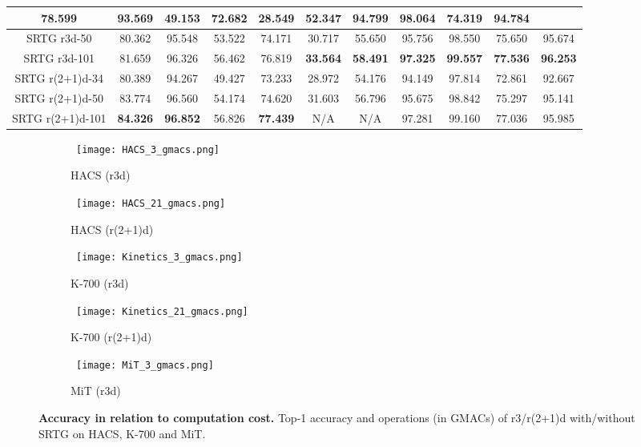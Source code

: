 \documentclass[final,5p,times,twocolumn]{elsarticle}
\begin{document}
\begin{table*}[ht]
{\begin{tabular}{ccccccccccc}
78.599 & 93.569 &
49.153 & 72.682 & 
28.549 & 52.347 &
94.799 & 98.064 &
74.319 & 94.784\\
\hline
SRTG r3d-50 &
80.362 & 95.548 &
53.522 & 74.171 & 
30.717 & 55.650 &
95.756 & 98.550 &
75.650 & 95.674\\
\hline
SRTG r3d-101 &
81.659 & 96.326 &
56.462 & 76.819 & 
\textbf{33.564} & \textbf{58.491} &
\textbf{97.325} & \textbf{99.557} &
\textbf{77.536} & \textbf{96.253}\\
\hline
SRTG r(2+1)d-34 &
80.389 & 94.267 &
49.427 & 73.233 & 
28.972 & 54.176 &
94.149 & 97.814 &
72.861 & 92.667\\
\hline
SRTG r(2+1)d-50 &
83.774 & 96.560 &
54.174 & 74.620 & 
31.603 & 56.796 &
95.675 & 98.842 &
75.297 & 95.141\\
\hline
SRTG r(2+1)d-101 &
\textbf{84.326} & \textbf{96.852} &
56.826 & \textbf{77.439} & 
N/A & N/A &
97.281 & 99.160 &
77.036 & 95.985\\
\hline
\hline
\end{tabular}}
\label{table:accuracies_full}
\vspace{-1mm}
\end{table*}


\begin{figure*}[!htb]\centering
    \begin{subfigure}{.19\linewidth}
    	\centering\ \texttt{[image: HACS\_3\_gmacs.png]}
   		\caption{HACS (r3d)}\label{fig:acc2gmacs::subfig::a}
    \end{subfigure}
    \begin{subfigure}{.19\linewidth}
    	\centering\ \texttt{[image: HACS\_21\_gmacs.png]}
   		\caption{HACS (r(2+1)d)}\label{fig:acc2gmacs::subfig::b}
    \end{subfigure}
    \begin{subfigure}{.19\linewidth}
    	\centering\ \texttt{[image: Kinetics\_3\_gmacs.png]}
   		\caption{K-700 (r3d)}\label{fig:acc2gmacs::subfig::c}
    \end{subfigure}
    \begin{subfigure}{.19\linewidth}
    	\centering\ \texttt{[image: Kinetics\_21\_gmacs.png]}
   		\caption{K-700 (r(2+1)d)}\label{fig:acc2gmacs::subfig::d}
    \end{subfigure}
    \begin{subfigure}{.19\linewidth}
    	\centering\ \texttt{[image: MiT\_3\_gmacs.png]}
   		\caption{MiT (r3d)}\label{fig:acc2gmacs::subfig::e}
    \end{subfigure}
    \caption{\textbf{Accuracy in relation to computation cost.} Top-1 accuracy and operations (in GMACs) of r3/r(2+1)d with/without SRTG on HACS, K-700 and MiT.}
    \label{fig:acc2gmacs}\vspace{-1mm}
\end{figure*}
\end{document}
